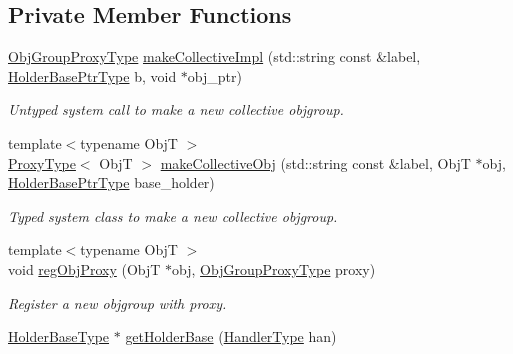 \subsection*{Private Member Functions}
\begin{DoxyCompactItemize}
\item 
\hyperlink{namespacevt_ad7cae989df485fccca57f0792a880a8e}{Obj\+Group\+Proxy\+Type} \hyperlink{structvt_1_1objgroup_1_1_obj_group_manager_a94b63a2791fd43999d6168d8c930ea51}{make\+Collective\+Impl} (std\+::string const \&label, \hyperlink{structvt_1_1objgroup_1_1_obj_group_manager_ac1e9bb19d4a5923dd6d595bad28f04c9}{Holder\+Base\+Ptr\+Type} b, void $\ast$obj\+\_\+ptr)
\begin{DoxyCompactList}\small\item\em Untyped system call to make a new collective objgroup. \end{DoxyCompactList}\item 
{\footnotesize template$<$typename ObjT $>$ }\\\hyperlink{structvt_1_1objgroup_1_1_obj_group_manager_aea65eef52f240a52210132eef5ce591f}{Proxy\+Type}$<$ ObjT $>$ \hyperlink{structvt_1_1objgroup_1_1_obj_group_manager_ad31e3c3723477c9dba771975c0a6fc73}{make\+Collective\+Obj} (std\+::string const \&label, ObjT $\ast$obj, \hyperlink{structvt_1_1objgroup_1_1_obj_group_manager_ac1e9bb19d4a5923dd6d595bad28f04c9}{Holder\+Base\+Ptr\+Type} base\+\_\+holder)
\begin{DoxyCompactList}\small\item\em Typed system class to make a new collective objgroup. \end{DoxyCompactList}\item 
{\footnotesize template$<$typename ObjT $>$ }\\void \hyperlink{structvt_1_1objgroup_1_1_obj_group_manager_a73d5d6f3f63c1243d7f0ea11f33a4661}{reg\+Obj\+Proxy} (ObjT $\ast$obj, \hyperlink{namespacevt_ad7cae989df485fccca57f0792a880a8e}{Obj\+Group\+Proxy\+Type} proxy)
\begin{DoxyCompactList}\small\item\em Register a new objgroup with proxy. \end{DoxyCompactList}\item 
\hyperlink{structvt_1_1objgroup_1_1_obj_group_manager_a4898fc9cabf44890e5593f8c4ab86230}{Holder\+Base\+Type} $\ast$ \hyperlink{structvt_1_1objgroup_1_1_obj_group_manager_a5e471b3448e27e86697dcbb00e053230}{get\+Holder\+Base} (\hyperlink{namespacevt_af64846b57dfcaf104da3ef6967917573}{Handler\+Type} han)

\end{DoxyCompactItemize}
